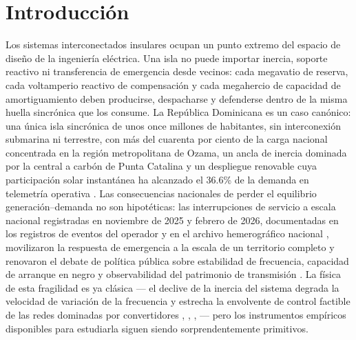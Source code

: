 \section{Introducción}
\label{sec:intro}

Los sistemas interconectados insulares ocupan un punto extremo del espacio de diseño de la ingeniería eléctrica. Una isla no puede importar inercia, soporte reactivo ni transferencia de emergencia desde vecinos: cada megavatio de reserva, cada voltamperio reactivo de compensación y cada megahercio de capacidad de amortiguamiento deben producirse, despacharse y defenderse dentro de la misma huella sincrónica que los consume. La República Dominicana es un caso canónico: una única isla sincrónica de unos once millones de habitantes, sin interconexión submarina ni terrestre, con más del cuarenta por ciento de la carga nacional concentrada en la región metropolitana de Ozama, un ancla de inercia dominada por la central a carbón de Punta Catalina y un despliegue renovable cuya participación solar instantánea ha alcanzado el 36.6\% de la demanda en telemetría operativa \cite{ocseni}. Las consecuencias nacionales de perder el equilibrio generación--demanda no son hipotéticas: las interrupciones de servicio a escala nacional registradas en noviembre de 2025 y febrero de 2026, documentadas en los registros de eventos del operador \cite{ocseni} y en el archivo hemerográfico nacional \cite{listin2025}, movilizaron la respuesta de emergencia a la escala de un territorio completo y renovaron el debate de política pública sobre estabilidad de frecuencia, capacidad de arranque en negro y observabilidad del patrimonio de transmisión \cite{blackout2004}. La física de esta fragilidad es ya clásica \cite{kundur1994} --- el declive de la inercia del sistema degrada la velocidad de variación de la frecuencia y estrecha la envolvente de control factible de las redes dominadas por convertidores \cite{tielens2016}, \cite{milano2018}, \cite{dorfler2013}, \cite{hatziargyriou2021} --- pero los instrumentos empíricos disponibles para estudiarla siguen siendo sorprendentemente primitivos.

